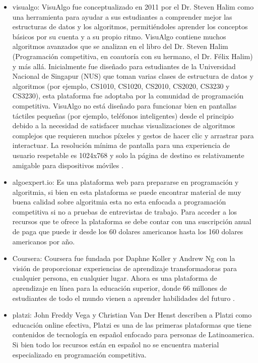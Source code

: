 \begin{itemize}
    \item visualgo: VisuAlgo fue conceptualizado en 2011 por el Dr. Steven Halim como una herramienta para ayudar a sus estudiantes a comprender mejor las estructuras de datos y los algoritmos, permitiéndoles aprender los conceptos básicos por su cuenta y a su propio ritmo. VisuAlgo contiene muchos algoritmos avanzados que se analizan en el libro del Dr. Steven Halim (Programación competitiva, en coautoría con su hermano, el Dr. Félix Halim) y más allá. Inicialmente fue diseñado para estudiantes de la Universidad Nacional de Singapur (NUS) que toman varias clases de estructura de datos y algoritmos (por ejemplo, CS1010, CS1020, CS2010, CS2020, CS3230 y CS3230), esta plataforma fue adoptaba por la comunidad de programación competitiva. VisuAlgo no está diseñado para funcionar bien en pantallas táctiles pequeñas (por ejemplo, teléfonos inteligentes) desde el principio debido a la necesidad de satisfacer muchas visualizaciones de algoritmos complejos que requieren muchos píxeles y gestos de hacer clic y arrastrar para interactuar. La resolución mínima de pantalla para una experiencia de usuario respetable es 1024x768 y solo la página de destino es relativamente amigable para dispositivos móviles \citep{visualgo}.
    \item algoexpert.io: Es una plataforma web para prepararse en programación y algoritmia, si bien en esta plataforma se puede encontrar material de muy buena calidad sobre algoritmia esta no esta enfocada a programación competitiva si no a pruebas de entrevistas de trabajo. Para acceder a los recursos que te ofrece la plataforma se debe contar con una suscripción anual de paga que puede ir desde los 60 dolares americanos hasta los 160 dolares americanos por año.
    \item Coursera: Coursera fue fundada por Daphne Koller y Andrew Ng con la visión de proporcionar experiencias de aprendizaje transformadoras para cualquier persona, en cualquier lugar. Ahora es una plataforma de aprendizaje en línea para la educación superior, donde 66 millones de estudiantes de todo el mundo vienen a aprender habilidades del futuro \citep{coursera}. 
    \item platzi: John Freddy Vega y Christian Van Der Henst describen a Platzi como educación online efectiva, Platzi es una de las primeras plataformas que tiene contenidos de tecnología en español enfocado para personas de Latinoamerica. Si bien todo los recursos están en español no se encuentra material especializado en programación competitiva.
\end{itemize}

